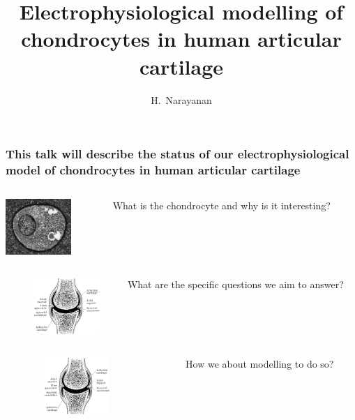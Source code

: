 \documentclass[ignorenonframetext]{beamer}
\title{Electrophysiological modelling of chondrocytes in human
  articular cartilage}
\author{H.~Narayanan}
\institute[]{}
\date[]{}
\begin{document}
%
%
%


\begin{frame}
  \frametitle{This talk will describe the status of our
    electrophysiological model of chondrocytes in human articular
    cartilage}
  \begin{columns}
    \begin{column}{3cm}
      \includegraphics[width=2.5cm]{../images/pdf/chondrocyte}
    \end{column}
    \begin{column}{9cm}
      What is the chondrocyte and why is it interesting?
    \end{column}
  \end{columns}
  \vspace{0.2cm}
  \begin{columns}
    \begin{column}{0.5cm}
    \end{column}
    \begin{column}{4.5cm}
      \includegraphics[width=2.5cm]{../images/pdf/joint}
    \end{column}
    \begin{column}{7cm}
      What are the specific questions we aim to answer?
    \end{column}
  \end{columns}
  \vspace{0.2cm}
  \begin{columns}
    \begin{column}{3.5cm}
    \end{column}
    \begin{column}{3cm}
      \includegraphics[width=2.5cm]{../images/pdf/joint}
    \end{column}
    \begin{column}{0.5cm}
    \end{column}
    \begin{column}{5cm}
      How we about modelling to do so?


\end{column}
\end{columns}
\end{frame}
\end{document}
